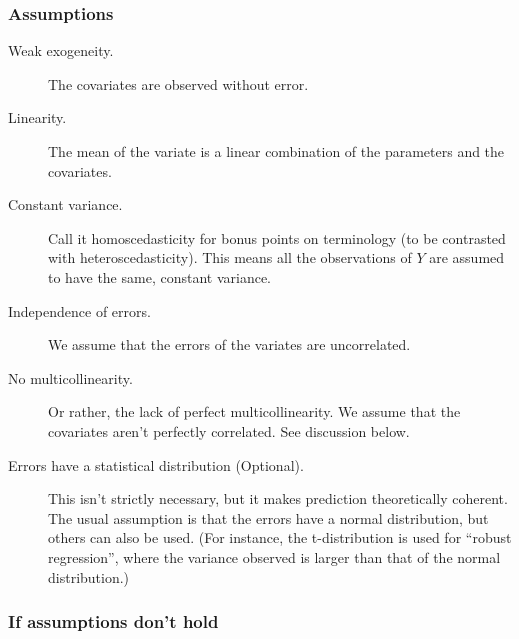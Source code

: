\documentclass[a4paper]{article}
\begin{document}
\subsubsection{Assumptions}
\begin{description}
  \item[Weak exogeneity.] The covariates are observed without error.
  \item[Linearity.] The mean of the variate is a linear combination of the parameters and the covariates.
  \item[Constant variance.] Call it homoscedasticity for bonus points on terminology (to be contrasted with heteroscedasticity).
  This means all the observations of $Y$ are assumed to have the same, constant variance.
  \item[Independence of errors.] We assume that the errors of the variates are uncorrelated.
  \item[No multicollinearity.] Or rather, the lack of perfect multicollinearity. We assume that the covariates aren't perfectly correlated. See discussion below.
  \item[Errors have a statistical distribution (Optional).] This isn't strictly necessary, but it makes prediction theoretically coherent. The usual assumption is that the errors have a normal distribution, but others can also be used.
  (For instance, the t-distribution is used for ``robust regression'', where the variance observed is larger than that of the normal distribution.)
\end{description}



\subsubsection{If assumptions don't hold}
\end{document}

